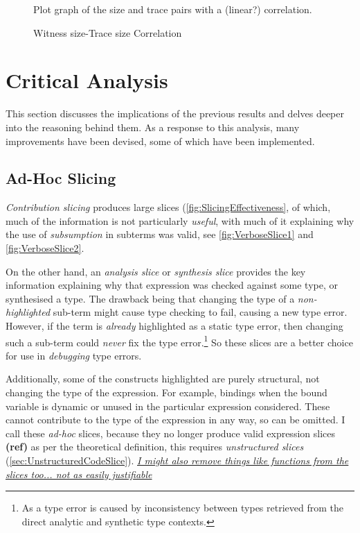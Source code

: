 \begin{figure}\centering
Plot graph of the size and trace pairs with a (linear?) correlation.
\caption{Witness size-Trace size Correlation}
\label{fig:WitnessTraceCorrelation}
\end{figure}



\section{Critical Analysis}\label{sec:CriticalAnalysis}
This section discusses the implications of the previous results and delves deeper into the reasoning behind them. As a response to this analysis, many improvements have been devised, some of which have been implemented.
\subsection{Ad-Hoc Slicing}\label{sec:SlicingAnalysis}
\textit{Contribution slicing} produces large slices (\cref{fig:SlicingEffectiveness}, of which, much of the information is not particularly \textit{useful}, with much of it explaining why the use of \textit{subsumption} in subterms was valid, see \cref{fig:VerboseSlice1} and \ref{fig:VerboseSlice2}. 

On the other hand, an \textit{analysis slice} or \textit{synthesis slice} provides the key information explaining why that expression was checked against some type, or synthesised a type. The drawback being that changing the type of a \textit{non-highlighted} sub-term might cause type checking to fail, causing a new type error. However, if the term is \textit{already} highlighted as a static type error, then changing such a sub-term could \textit{never} fix the type error.\footnote{As a type error is caused by inconsistency between types retrieved from the direct analytic and synthetic type contexts.} So these slices are a better choice for use in \textit{debugging} type errors.

Additionally, some of the constructs highlighted are purely structural, not changing the type of the expression. For example, bindings when the bound variable is dynamic or unused in the particular expression considered. These cannot contribute to the type of the expression in any way, so can be omitted. I call these \textit{ad-hoc} slices, because they no longer produce valid expression slices \textbf{(ref)} as per the theoretical definition, this requires \textit{unstructured slices} (\cref{sec:UnstructuredCodeSlice}). \textit{\underline{I might also remove things like functions from the slices too... not as easily justifiable}}


